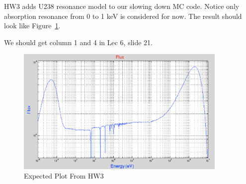 \documentclass{school-22.211-notes}
\begin{document}

HW3 adds U238 resonance model to our slowing down MC code. Notice only absorption resonance from 0 to 1 keV is considered for now. The result should look like Figure~\ref{HW3-result}. 

We should get column 1 and 4 in Lec 6,  slide 21. 

\begin{figure}
  \centering
  \includegraphics[width=4in]{images/HW3-result.png}
  \caption{Expected Plot From HW3} \label{HW3-result}
\end{figure}
\end{document}

